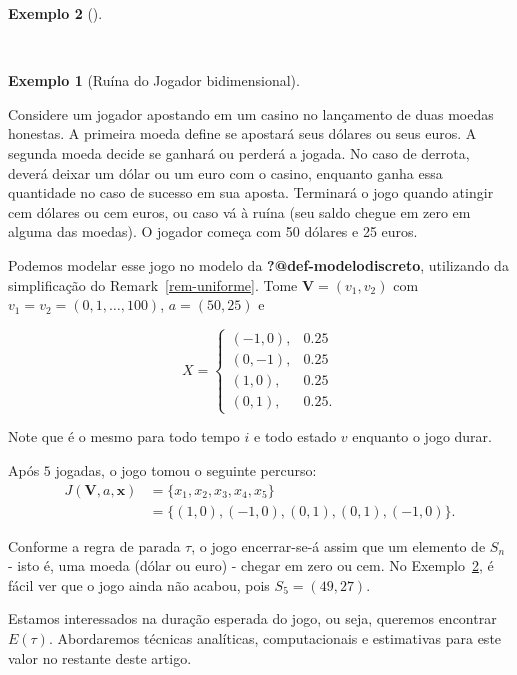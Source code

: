 \documentclass[
  brazilian,
  12pt,
]{article}
\theoremstyle{definition}
\newtheorem{example}{Exemplo}[section]
\theoremstyle{remark}
\begin{document}
\begin{example}[]\protect\hypertarget{exm-modelodiscreto}{}\label{exm-modelodiscreto}

~

\begin{example}[Ruína do Jogador
bidimensional]\protect\hypertarget{exm-modelodiscretodim}{}\label{exm-modelodiscretodim}

Considere um jogador apostando em um casino no lançamento de duas moedas
honestas. A primeira moeda define se apostará seus dólares ou seus
euros. A segunda moeda decide se ganhará ou perderá a jogada. No caso de
derrota, deverá deixar um dólar ou um euro com o casino, enquanto ganha
essa quantidade no caso de sucesso em sua aposta. Terminará o jogo
quando atingir cem dólares ou cem euros, ou caso vá à ruína (seu saldo
chegue em zero em alguma das moedas). O jogador começa com 50 dólares e
25 euros.

Podemos modelar esse jogo no modelo da \textbf{?@def-modelodiscreto},
utilizando da simplificação do Remark~\ref{rem-uniforme}. Tome
\(\pmb{V} = (v_1, v_2)\) com \(v_1 = v_2 = (0, 1, \dots, 100)\),
\(a = (50, 25)\) e

\[
X = \begin{cases}
(-1, 0), & 0.25 \\
(0, -1), & 0.25 \\
(1, 0), & 0.25 \\
(0, 1), & 0.25.
\end{cases}
\]

Note que é o mesmo para todo tempo \(i\) e todo estado \(v\) enquanto o
jogo durar.

Após \(5\) jogadas, o jogo tomou o seguinte percurso: \[
\begin{aligned}
J(\pmb{V}, a, \pmb{x}) &= \{x_1, x_2, x_3, x_4, x_5\} \\
&= \{(1,0), (-1, 0), (0, 1), (0, 1), (-1, 0)\}.
\end{aligned}
\]

\end{example}

Conforme a regra de parada \(\tau\), o jogo encerrar-se-á assim que um
elemento de \(S_n\) - isto é, uma moeda (dólar ou euro) - chegar em zero
ou cem. No Exemplo~\ref{exm-modelodiscreto}, é fácil ver que o jogo
ainda não acabou, pois \(S_5 = (49,
27)\).

Estamos interessados na duração esperada do jogo, ou seja, queremos
encontrar \(E(\tau)\). Abordaremos técnicas analíticas, computacionais e
estimativas para este valor no restante deste artigo.


\end{example}
\end{document}
